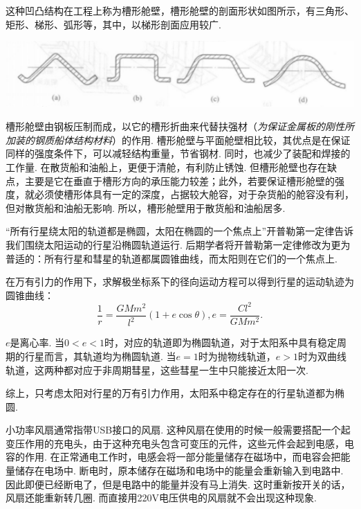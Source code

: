 \begin{multicols}{2}
这种凹凸结构在工程上称为槽形舱壁，槽形舱壁的剖面形状如图所示，有三角形、矩形、梯形、弧形等，其中，以梯形剖面应用较广. 

\noindent\includegraphics[width=\linewidth]{IMG/201910/191012.png}

槽形舱壁由钢板压制而成，以它的槽形折曲来代替扶强材（\textit{为保证金属板的刚性所加装的钢质船体结构材料}）的作用. 槽形舱壁与平面舱壁相比较，其优点是在保证同样的强度条件下，可以减轻结构重量，节省钢材. 同时，也减少了装配和焊接的工作量. 在散货船和油船上，更便于清舱，有利防止锈蚀. 但槽形舱壁也存在缺点，主要是它在垂直于槽形方向的承压能力较差；此外，若要保证槽形舱壁的强度，就必须使槽形体具有一定的深度，占据较大舱容，对于杂货船的舱容没有利，但对散货船和油船无影响. 所以，槽形舱壁用于散货船和油船居多. 

\noindent{}

“所有行星绕太阳的轨道都是椭圆，太阳在椭圆的一个焦点上”开普勒第一定律告诉我们围绕太阳运动的行星沿椭圆轨道运行. 后期学者将开普勒第一定律修改为更为普适的：所有行星和彗星的轨道都属圆锥曲线，而太阳则在它们的一个焦点上. 

在万有引力的作用下，求解极坐标系下的径向运动方程可以得到行星的运动轨迹为圆锥曲线：
\[
\frac{1}{r}=\frac{GMm^2}{l^2}(1+e\cos\theta), e=\frac{Cl^2}{GMm^2}.
\]

$e$是离心率. 当$0<e<1$时，对应的轨道即为椭圆轨道，对于太阳系中具有稳定周期的行星而言，其轨道均为椭圆轨道. 当$e=1$时为抛物线轨道，$e>1$时为双曲线轨道，这两种都对应于非周期彗星，这些彗星一生中只能接近太阳一次. 

综上，只考虑太阳对行星的万有引力作用，太阳系中稳定存在的行星轨道都为椭圆. 


\noindent{}

小功率风扇通常指带USB接口的风扇. 这种风扇在使用的时候一般需要搭配一个起变压作用的充电头，由于这种充电头包含可变压的元件，这些元件会起到电感，电容的作用. 在正常通电工作时，电感会将一部分能量储存在磁场中，而电容会把能量储存在电场中. 断电时，原本储存在磁场和电场中的能量会重新输入到电路中. 因此即便已经断电了，但是电路中的能量并没有马上消失. 这时重新按开关的话，风扇还能重新转几圈. 而直接用220V电压供电的风扇就不会出现这种现象. 

\end{multicols}

\ADhairui

